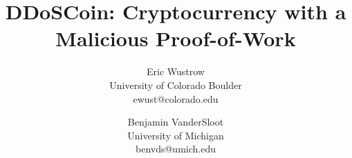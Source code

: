 \documentclass[letterpaper,twocolumn,10pt]{article}
\begin{document}
\title{DDoSCoin: Cryptocurrency with a Malicious Proof-of-Work}

\author{\rm{Eric Wustrow}\\
University of Colorado Boulder\\
{\small ewust@colorado.edu}
\and
\rm{Benjamin VanderSloot}\\
University of Michigan\\
{\small benvds@umich.edu}
}

\maketitle
\end{document}
